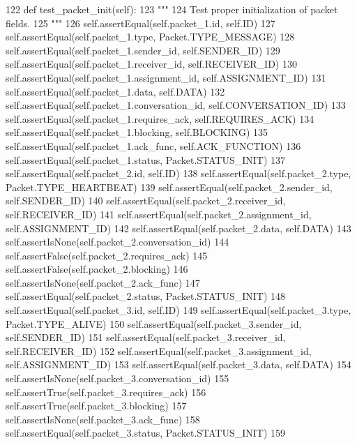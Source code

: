 \begin{DoxyCode}
122     \textcolor{keyword}{def }test\_packet\_init(self):
123         \textcolor{stringliteral}{"""}
124 \textcolor{stringliteral}{        Test proper initialization of packet fields.}
125 \textcolor{stringliteral}{        """}
126         self.assertEqual(self.packet\_1.id, self.ID)
127         self.assertEqual(self.packet\_1.type, Packet.TYPE\_MESSAGE)
128         self.assertEqual(self.packet\_1.sender\_id, self.SENDER\_ID)
129         self.assertEqual(self.packet\_1.receiver\_id, self.RECEIVER\_ID)
130         self.assertEqual(self.packet\_1.assignment\_id, self.ASSIGNMENT\_ID)
131         self.assertEqual(self.packet\_1.data, self.DATA)
132         self.assertEqual(self.packet\_1.conversation\_id, self.CONVERSATION\_ID)
133         self.assertEqual(self.packet\_1.requires\_ack, self.REQUIRES\_ACK)
134         self.assertEqual(self.packet\_1.blocking, self.BLOCKING)
135         self.assertEqual(self.packet\_1.ack\_func, self.ACK\_FUNCTION)
136         self.assertEqual(self.packet\_1.status, Packet.STATUS\_INIT)
137         self.assertEqual(self.packet\_2.id, self.ID)
138         self.assertEqual(self.packet\_2.type, Packet.TYPE\_HEARTBEAT)
139         self.assertEqual(self.packet\_2.sender\_id, self.SENDER\_ID)
140         self.assertEqual(self.packet\_2.receiver\_id, self.RECEIVER\_ID)
141         self.assertEqual(self.packet\_2.assignment\_id, self.ASSIGNMENT\_ID)
142         self.assertEqual(self.packet\_2.data, self.DATA)
143         self.assertIsNone(self.packet\_2.conversation\_id)
144         self.assertFalse(self.packet\_2.requires\_ack)
145         self.assertFalse(self.packet\_2.blocking)
146         self.assertIsNone(self.packet\_2.ack\_func)
147         self.assertEqual(self.packet\_2.status, Packet.STATUS\_INIT)
148         self.assertEqual(self.packet\_3.id, self.ID)
149         self.assertEqual(self.packet\_3.type, Packet.TYPE\_ALIVE)
150         self.assertEqual(self.packet\_3.sender\_id, self.SENDER\_ID)
151         self.assertEqual(self.packet\_3.receiver\_id, self.RECEIVER\_ID)
152         self.assertEqual(self.packet\_3.assignment\_id, self.ASSIGNMENT\_ID)
153         self.assertEqual(self.packet\_3.data, self.DATA)
154         self.assertIsNone(self.packet\_3.conversation\_id)
155         self.assertTrue(self.packet\_3.requires\_ack)
156         self.assertTrue(self.packet\_3.blocking)
157         self.assertIsNone(self.packet\_3.ack\_func)
158         self.assertEqual(self.packet\_3.status, Packet.STATUS\_INIT)
159 
\end{DoxyCode}
\mbox{\label{classparlai_1_1mturk_1_1core_1_1test_1_1test__socket__manager_1_1TestPacket_ae5fcf1f88951dbc60a870285f86029d6}} 
